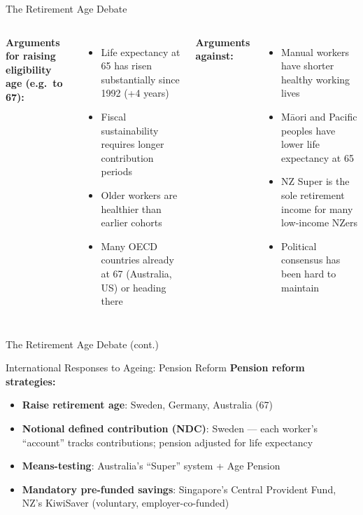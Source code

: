 \documentclass[aspectratio=169, 12pt]{beamer}
\begin{document}
\begin{frame}{The Retirement Age Debate}
  \begin{columns}
      \small\textbf{Arguments for raising eligibility age (e.g.\ to 67):}
      \begin{itemize}\small
        \item Life expectancy at 65 has risen substantially since 1992 (+4 years)
        \item Fiscal sustainability requires longer contribution periods
        \item Older workers are healthier than earlier cohorts
        \item Many OECD countries already at 67 (Australia, US) or heading there
      \end{itemize}
      \small\textbf{Arguments against:}
      \begin{itemize}\small
        \item Manual workers have shorter healthy working lives
        \item M\=aori and Pacific peoples have lower life expectancy at 65
        \item NZ Super is the sole retirement income for many low-income NZers
        \item Political consensus has been hard to maintain
      \end{itemize}
  \end{columns}
\end{frame}

\begin{frame}{The Retirement Age Debate (cont.)}
\end{frame}

\begin{frame}{International Responses to Ageing: Pension Reform}
  \textbf{Pension reform strategies:}
  \begin{itemize}
    \item \textbf{Raise retirement age}: Sweden, Germany, Australia (67)
    \item \textbf{Notional defined contribution (NDC)}: Sweden --- each worker's ``account''
          tracks contributions; pension adjusted for life expectancy
    \item \textbf{Means-testing}: Australia's ``Super'' system + Age Pension
    \item \textbf{Mandatory pre-funded savings}: Singapore's Central Provident Fund,
          NZ's KiwiSaver (voluntary, employer-co-funded)
  \end{itemize}
\end{frame}
\end{document}
